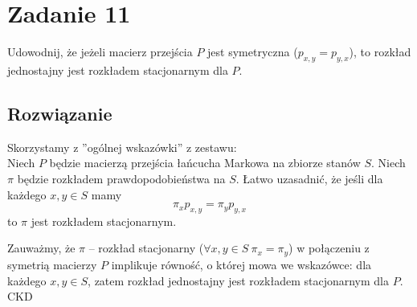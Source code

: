 \section{Zadanie 11}
\label{set07.task11}
Udowodnij, że jeżeli macierz przejścia \(P\) jest symetryczna (\(p_{x,y}=p_{y,x}\)), to rozkład jednostajny jest rozkładem stacjonarnym dla \(P\).

\subsection*{Rozwiązanie}
Skorzystamy z ”ogólnej wskazówki” z zestawu:\\
Niech \(P\) będzie macierzą przejścia łańcucha Markowa na zbiorze stanów \(S\).
Niech \(\pi\) będzie rozkładem prawdopodobieństwa na \(S\).
Łatwo uzasadnić, że jeśli dla każdego \(x,y\in S\) mamy
\[
	\pi_x p_{x,y} = \pi_y p_{y,x}
\]
to \(\pi\) jest rozkładem stacjonarnym.

Zauważmy, że \(\pi\) – rozkład stacjonarny (\(\forall x,y\in S\ \pi_x=\pi_y\)) w połączeniu z symetrią
macierzy \(P\) implikuje równość, o której mowa we wskazówce: dla każdego \(x,y\in S\), zatem rozkład jednostajny jest rozkładem stacjonarnym dla \(P\). CKD

